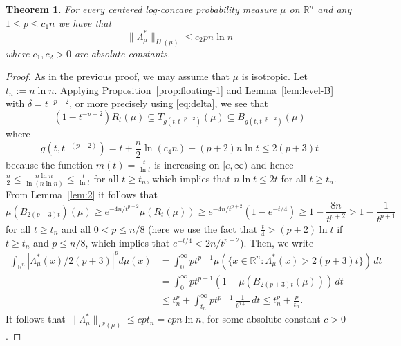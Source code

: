 \documentclass[11pt,leqno]{article}
\newtheorem{theorem}{Theorem}[section]
\theoremstyle{definition}
\theoremstyle{remark}
\numberwithin{equation}{section}
\newcommand{\ls}{\leqslant}
\newcommand{\gr}{\geqslant}
\newcommand{\1}{\textbf{1}}
\begin{document}
\begin{theorem}\label{th:small-moments-p}For every centered log-concave probability measure $\mu$ on ${\mathbb R}^n$
and any $1\ls p\ls c_1n$ we have that
$$\|\Lambda_{\mu}^{\ast}\|_{L^p(\mu)}\ls c_2pn\ln n$$
where $c_1,c_2>0$ are absolute constants.
\end{theorem}


\begin{proof}As in the previous proof, we may assume that $\mu$ is isotropic.
Let $t_n:=n\ln n$. Applying Proposition~\ref{prop:floating-1} and Lemma~\ref{lem:level-B} with
$\delta=t^{-p-2}$, or more precisely using \eqref{eq:delta}, we see that
\begin{equation}\label{eq:for-theorem-4.2-1}(1-t^{-p-2})R_t(\mu)\subseteq T_{g(t,t^{-p-2})}(\mu)\subseteq B_{g(t,t^{-p-2})}(\mu)\end{equation}
where 
\begin{equation}\label{eq:for-theorem-4.2-2}g(t,t^{-(p+2)})=t+\frac{n}{2}\ln(c_4n)+(p+2)n\ln t\ls 2(p+3)t\end{equation}
because the function $m(t)=\frac{t}{\ln t}$ is increasing on $[e,\infty)$ and hence
$\frac{n}{2}\ls \frac{n\ln n}{\ln(n\ln n)} \ls \frac{t}{\ln t}$ for all $t\gr t_n$, which
implies that $n\ln t\ls 2t$ for all $t\gr t_n$. From Lemma~\ref{lem:2} it follows that
$$\mu(B_{2(p+3)t})(\mu)\gr e^{-4n/t^{p+2}}\mu(R_t(\mu))\gr  e^{-4n/t^{p+2}}(1-e^{-t/4})\gr 1-\frac{8n}{t^{p+2}}>1-\frac{1}{t^{p+1}}$$
for all $t\gr t_n$ and all $0<p\ls n/8$ (here we use the fact that $\frac{t}{4}>(p+2)\ln t$ if $t\gr t_n$ and $p\ls n/8$,
which implies that $e^{-t/4}<2n/t^{p+2}$). Then, we write
\begin{align*}\int_{\mathbb{R}^n}|\Lambda_{\mu}^{\ast}(x)/2(p+3)|^pd\mu(x)
&=\int_0^{\infty}pt^{p-1}\mu(\{x\in {\mathbb R}^n:\Lambda_{\mu}^{\ast}(x)>2(p+3)t\})\,dt\\
&=\int_0^{\infty}pt^{p-1}(1-\mu(B_{2(p+3)t}(\mu)))\,dt\\
&\ls t_n^p+\int_{t_n}^{\infty}pt^{p-1}\,\frac{1}{t^{p+1}}\,dt
\ls t_n^p+\frac{p}{t_n}.
\end{align*}
It follows that $\|\Lambda_{\mu}^{\ast}\|_{L^p(\mu)}\ls cpt_n=cpn\ln n$, for some absolute constant $c>0$.
\end{proof}
\end{document}
